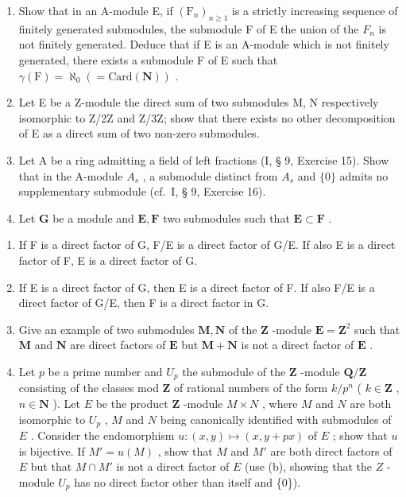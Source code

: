 \begin{enumerate}
\def\labelenumi{\arabic{enumi}.}
\setcounter{enumi}{8}
\item
  Show that in an A-module E, if \((\mathrm{F}_{n})_{n\geqslant1}\) is a strictly increasing sequence of finitely generated submodules, the submodule F of E the union of the \(F_{n}\) is not finitely generated. Deduce that if E is an A-module which is not finitely generated, there exists a submodule F of E such that \(\gamma(\mathrm{F})=\aleph_{0}(=\mathrm{Card}(\mathbf{N}))\) .
\item
  Let E be a Z-module the direct sum of two submodules M, N respectively isomorphic to Z/2Z and Z/3Z; show that there exists no other decomposition of E as a direct sum of two non-zero submodules.
\item
  Let A be a ring admitting a field of left fractions (I, § 9, Exercise 15). Show that in the A-module \(A_{s}\) , a submodule distinct from \(A_{s}\) and \(\{0\}\) admits no supplementary submodule (cf.~I, § 9, Exercise 16).
\item
  Let \(\mathbf{G}\) be a module and \(\mathbf{E}, \mathbf{F}\) two submodules such that \(\mathbf{E} \subset \mathbf{F}\) .
\end{enumerate}

\begin{enumerate}
\def\labelenumi{(\alph{enumi})}
\item
  If F is a direct factor of G, F/E is a direct factor of G/E. If also E is a direct factor of F, E is a direct factor of G.
\item
  If E is a direct factor of G, then E is a direct factor of F. If also F/E is a direct factor of G/E, then F is a direct factor in G.
\item
  Give an example of two submodules \(\mathbf{M}, \mathbf{N}\) of the \(\mathbf{Z}\) -module \(\mathbf{E} = \mathbf{Z}^2\) such that \(\mathbf{M}\) and \(\mathbf{N}\) are direct factors of \(\mathbf{E}\) but \(\mathbf{M} + \mathbf{N}\) is not a direct factor of \(\mathbf{E}\) .
\item
  Let \(p\) be a prime number and \(U_p\) the submodule of the \(\mathbf{Z}\) -module \(\mathbf{Q} / \mathbf{Z}\) consisting of the classes mod \(\mathbf{Z}\) of rational numbers of the form \(k / p^n\) ( \(k \in \mathbf{Z}\) , \(n \in \mathbf{N}\) ). Let \(E\) be the product \(\mathbf{Z}\) -module \(M \times N\) , where \(M\) and \(N\) are both isomorphic to \(U_p\) , \(M\) and \(N\) being canonically identified with submodules of \(E\) . Consider the endomorphism \(u: (x, y) \mapsto (x, y + px)\) of \(E\) ; show that \(u\) is bijective. If \(M' = u(M)\) , show that \(M\) and \(M'\) are both direct factors of \(E\) but that \(M \cap M'\) is not a direct factor of \(E\) (use (b), showing that the \(Z\) -module \(U_p\) has no direct factor other than itself and \{0\}).
\end{enumerate}

